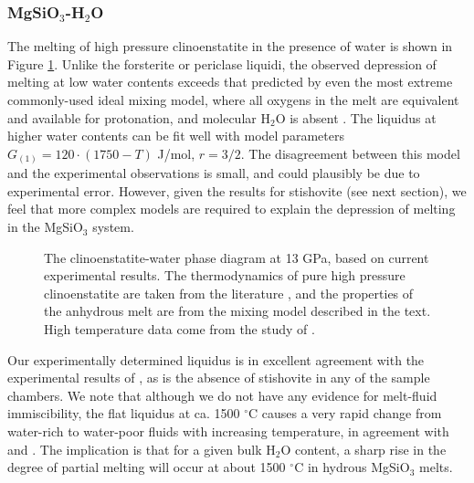 \documentclass[review]{elsarticle}
\begin{document}
\subsubsection{MgSiO$_3$-H$_2$O}
The melting of high pressure clinoenstatite in the presence of water is shown in Figure \ref{fig:eoH}. Unlike the forsterite or periclase liquidi, the observed depression of melting at low water contents exceeds that predicted by even the most extreme commonly-used ideal mixing model, where all oxygens in the melt are equivalent and available for protonation, and molecular H$_2$O is absent \citep{SS1985}. The liquidus at higher water contents can be fit well with model parameters $G_{(1)} = 120 \cdot (1750-T)$ J/mol, $r=3/2$. The disagreement between this model and the experimental observations is small, and could plausibly be due to experimental error. However, given the results for stishovite (see next section), we feel that more complex models are required to explain the depression of melting in the MgSiO$_3$ system. 

\begin{figure}[ht!]
  \centering
  \caption{The clinoenstatite-water phase diagram at 13 GPa, based on current experimental results. The thermodynamics of pure high pressure clinoenstatite are taken from the literature \citep{SLB2011}, and the properties of the anhydrous melt are from the mixing model described in the text. High temperature data come from the study of \cite{NDMF2015}.}
  \label{fig:eoH}
\end{figure}

Our experimentally determined liquidus is in excellent agreement with the experimental results of \cite{YII2004}, as is the absence of stishovite in any of the sample chambers. We note that although we do not have any evidence for melt-fluid immiscibility, the flat liquidus at ca. 1500 $^{\circ}$C causes a very rapid change from water-rich to water-poor fluids with increasing temperature, in agreement with \cite{Inoue1994} and \cite{YII2004}. The implication is that for a given bulk H$_2$O content, a sharp rise in the degree of partial melting will occur at about 1500 $^{\circ}$C in hydrous MgSiO$_3$ melts.

\clearpage
\end{document}
